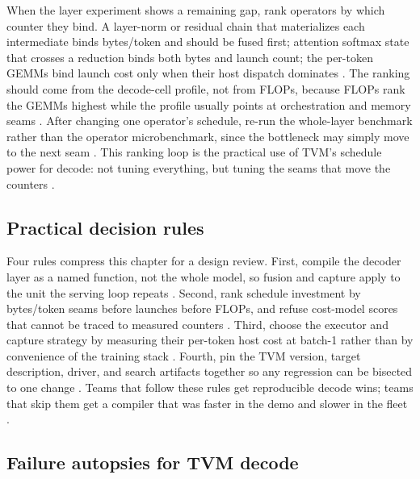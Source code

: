 When the layer experiment shows a remaining gap, rank operators by which counter they bind. A layer-norm or residual chain that materializes each intermediate binds bytes/token and should be fused first; attention softmax state that crosses a reduction binds both bytes and launch count; the per-token GEMMs bind launch cost only when their host dispatch dominates \citep{dao2022flashattention,memoryfloor2026,taxbreak2026}. The ranking should come from the decode-cell profile, not from FLOPs, because FLOPs rank the GEMMs highest while the profile usually points at orchestration and memory seams \citep{patel2025llminference,kwon2023vllm}. After changing one operator's schedule, re-run the whole-layer benchmark rather than the operator microbenchmark, since the bottleneck may simply move to the next seam \citep{memoryfloor2026,patel2025llminference}. This ranking loop is the practical use of TVM's schedule power for decode: not tuning everything, but tuning the seams that move the counters \citep{chen2018tvm,yirage2026}.

\subsection{Practical decision rules}

Four rules compress this chapter for a design review. First, compile the decoder layer as a named function, not the whole model, so fusion and capture apply to the unit the serving loop repeats \citep{dao2022flashattention,taxbreak2026}. Second, rank schedule investment by bytes/token seams before launches before FLOPs, and refuse cost-model scores that cannot be traced to measured counters \citep{memoryfloor2026,patel2025llminference}. Third, choose the executor and capture strategy by measuring their per-token host cost at batch-1 rather than by convenience of the training stack \citep{kwon2023vllm,nvidia2024cudagraphs}. Fourth, pin the TVM version, target description, driver, and search artifacts together so any regression can be bisected to one change \citep{chen2020compilerbasedhardw,yirage2026}. Teams that follow these rules get reproducible decode wins; teams that skip them get a compiler that was faster in the demo and slower in the fleet \citep{taxbreak2026,memoryfloor2026}.

\subsection{Failure autopsies for TVM decode}

